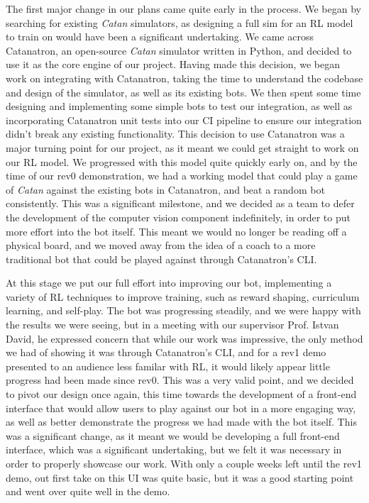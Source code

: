 \documentclass{article}
\begin{document}
The first major change in our plans came quite early in the process.
We began by searching for existing \emph{Catan} simulators, as designing a full sim for an RL model to
train on would have been a significant undertaking.
We came across Catanatron, an open-source \emph{Catan} simulator written in Python, and decided to use it as
the core engine of our project.
Having made this decision, we began work on integrating with Catanatron, taking the time to understand
the codebase and design of the simulator, as well as its existing bots.
We then spent some time designing and implementing some simple bots to test our integration,
as well as incorporating Catanatron unit tests into our CI pipeline to ensure our integration didn't
break any existing functionality.
This decision to use Catanatron was a major turning point for our project, as it meant we could get
straight to work on our RL model.
We progressed with this model quite quickly early on, and by the time of our rev0 demonstration,
we had a working model that could play a game of \emph{Catan} against the existing bots in Catanatron,
and beat a random bot consistently.
This was a significant milestone, and we decided as a team to defer the development of the
computer vision component indefinitely, in order to put more effort into the bot itself.
This meant we would no longer be reading off a physical board, and we moved away from the idea of a coach
to a more traditional bot that could be played against through Catanatron's CLI.

At this stage we put our full effort into improving our bot, implementing a variety of RL techniques
to improve training, such as reward shaping, curriculum learning, and self-play.
The bot was progressing steadily, and we were happy with the results we were seeing, but in a
meeting with our supervisor Prof. Istvan David, he expressed concern that while our work was impressive,
the only method we had of showing it was through Catanatron's CLI, and for a rev1 demo presented
to an audience less familar with RL, it would likely appear little progress had been made since rev0.
This was a very valid point, and we decided to pivot our design once again, this time towards the
development of a front-end interface that would allow users to play against our bot in a more
engaging way, as well as better demonstrate the progress we had made with the bot itself.
This was a significant change, as it meant we would be developing a full front-end interface,
which was a significant undertaking, but we felt it was necessary in order to properly showcase our work.
With only a couple weeks left until the rev1 demo, out first take on this UI was quite basic, but
it was a good starting point and went over quite well in the demo.
\end{document}
